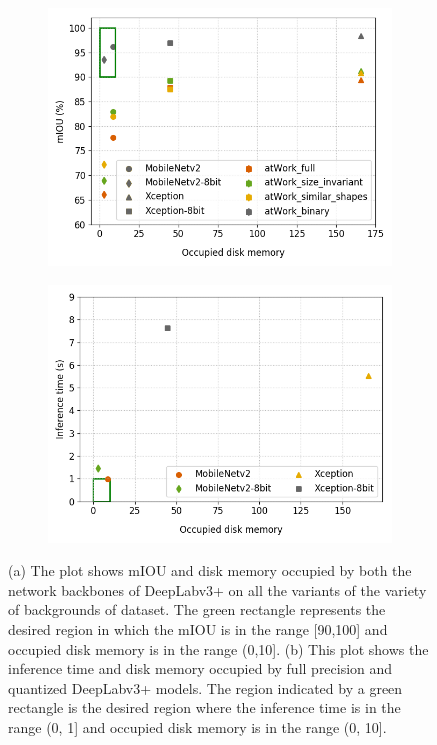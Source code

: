	\begin{figure}
		\centering
		\begin{subfigure}{.45\textwidth}
			\centering
			\includegraphics[width=1\linewidth]{images/quant}
			\caption{}
			\label{Fig:quantb}
		\end{subfigure}
		\begin{subfigure}{.45\textwidth}
			\centering
			\includegraphics[width=1\linewidth]{images/quant_time}
			\caption{}
			\label{Fig:quanta}
		\end{subfigure}
		\caption{(a) The plot shows mIOU and disk memory occupied by both the network backbones of DeepLabv3+ on all the variants of the variety of backgrounds of dataset. The green rectangle represents the desired region in which the mIOU is in the range [90,100] and occupied disk memory is in the range (0,10]. (b) This plot shows the inference time and disk memory occupied by full precision and quantized DeepLabv3+ models. The region indicated by a green rectangle is the desired region where the inference time is in the range (0, 1] and occupied disk memory is in the range (0, 10].}
		\label{Fig:quant}
	\end{figure}
	
